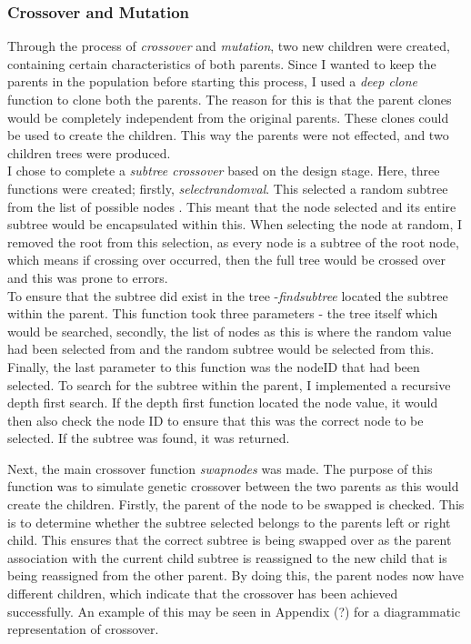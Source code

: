 \documentclass[11pt]{article}
\begin{document}
\subsubsection{Crossover and Mutation}\label{subsubsec:CM}
Through the process of \textit{crossover} and \textit{mutation}, two new children were created, containing certain characteristics of both parents. Since I wanted to keep the parents in the population before starting this process, I used a \textit{deep clone} function to clone both the parents. The reason for this is that the parent clones would be completely independent from the original parents. These clones could be used to create the children. This way the parents were not effected, and two children trees were produced. 
\\
I chose to complete a \textit{subtree crossover} based on the design stage. Here, three functions were created; firstly, \textit{select\textunderscore random\textunderscore val}. This selected a random subtree from the list of possible nodes . This meant that the node selected and its entire subtree would be encapsulated within this. When selecting the node at random, I removed the root from this selection, as every node is a subtree of the root node, which means if crossing over occurred, then the full tree would be crossed over and this was prone to errors. \\

To ensure that the subtree did exist in the tree -\textit{find\textunderscore subtree} located the subtree within the parent. This function took three parameters - the tree itself which would be searched, secondly, the list of nodes as this is where the random value had been selected from and the random subtree would be selected from this. Finally, the last parameter to this function was the nodeID that had been selected. To search for the subtree within the parent, I implemented a recursive depth first search. If the depth first function located the node value, it would then also check the node ID to ensure that this was the correct node to be selected. If the subtree was found, it was returned.

Next, the main crossover function \textit{swap\textunderscore nodes} was made. The purpose of this function was to simulate genetic crossover between the two parents as this would create the children. Firstly, the parent of the node to be swapped is checked. This is to determine whether the subtree selected belongs to the parents left or right child. This ensures that the correct subtree is being swapped over as the parent association with the current child subtree is reassigned to the new child that is being reassigned from the other parent. By doing this, the parent nodes now have different children, which indicate that the crossover has been achieved successfully. An example of this may be seen in Appendix (?) for a diagrammatic representation of crossover. 
\end{document}
